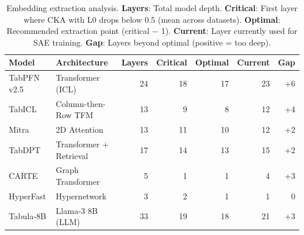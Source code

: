\begin{table}[h]
\centering
\small
\begin{tabular}{llrrrrr}
\toprule
\textbf{Model} & \textbf{Architecture} & \textbf{Layers} & \textbf{Critical} & \textbf{Optimal} & \textbf{Current} & \textbf{Gap} \\
\midrule
TabPFN v2.5     & Transformer (ICL)         & 24 & 18 & 17 & 23 & +6 \\
TabICL          & Column-then-Row TFM       & 13 &  9 &  8 & 12 & +4 \\
Mitra           & 2D Attention              & 13 & 11 & 10 & 12 & +2 \\
TabDPT          & Transformer + Retrieval   & 17 & 14 & 13 & 15 & +2 \\
CARTE           & Graph Transformer         &  5 &  1 &  1 &  4 & +3 \\
HyperFast       & Hypernetwork              &  3 &  2 &  1 &  1 &  0 \\
Tabula-8B       & Llama-3 8B (LLM)          & 33 & 19 & 18 & 21 & +3 \\
\bottomrule
\end{tabular}
\caption{Embedding extraction analysis. \textbf{Layers}: Total model depth. \textbf{Critical}: First layer where CKA with L0 drops below 0.5 (mean across datasets). \textbf{Optimal}: Recommended extraction point (critical $-$ 1). \textbf{Current}: Layer currently used for SAE training. \textbf{Gap}: Layers beyond optimal (positive = too deep).}
\label{tab:extraction_layers_detailed}
\end{table}

